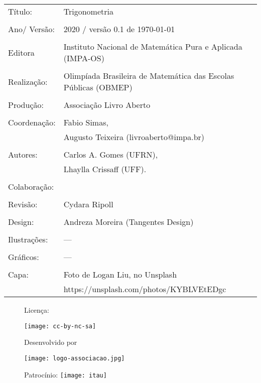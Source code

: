 \begin{tabular}{p{}p{}}
Título: & Trigonometria\\
\\
Ano/ Versão: & 2020 / versão 0.1 de \today\\
\\
Editora & Instituto Nacional de Matem\'atica Pura e Aplicada (IMPA-OS)\\
\\
Realização:& Olimp\'iada Brasileira de Matem\'atica das Escolas P\'ublicas (OBMEP)\\
\\
Produção:& Associação Livro Aberto\\
\\
Coordenação: & Fabio Simas, \\
			&  Augusto Teixeira (livroaberto@impa.br)\\
\\
  Autores: & Carlos A. Gomes (UFRN),\\
             & Lhaylla Crissaff (UFF).\\
        
\\
Colaboração: & \\
\\
Revisão: & Cydara Ripoll \\

\\
Design: & Andreza Moreira (Tangentes Design) \\
\\
  Ilustrações: & --- \\ 
\\
Gráficos: & ---\\
\\
  Capa: & Foto de Logan Liu, no Unsplash \\
  		& https://unsplash.com/photos/KYBLVEtEDgc \\

\end{tabular}
\vspace{.5cm}



\begin{figure}[b]
\begin{minipage}[l]{5cm}
\centering

{\large Licença:}

  \texttt{[image: cc-by-nc-sa]}
\end{minipage}\hfill
\begin{minipage}[c]{5cm}
\centering
{\large Desenvolvido por}

\texttt{[image: logo-associacao.jpg]}
\end{minipage}
\begin{minipage}[r]{5cm}
\centering

{\large Patrocínio:}
  \vspace{1em}
  \texttt{[image: itau]}
\end{minipage}
\end{figure}

